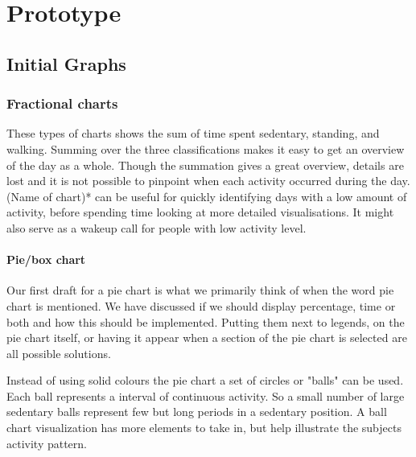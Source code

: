 \chapter{Prototype} %

\label{Chapter5} %


\section{Initial Graphs}

\subsection{Fractional charts}
These types of charts shows the sum of time spent sedentary, standing, and walking. Summing over the three classifications makes it easy to get an overview of the day as a whole. Though the summation gives a great overview, details are lost and it is not possible to pinpoint when each activity occurred during the day. (Name of chart)* can be useful for quickly identifying days with a low amount of activity, before spending time looking at more detailed visualisations. It might also serve as a wakeup call for people with low activity level.

\subsubsection{Pie/box chart}
Our first draft for a pie chart is what we primarily think of when the word pie chart is mentioned. We have discussed if we should display percentage, time or both and how this should be implemented. Putting them next to legends, on the pie chart itself, or having it appear when a section of the pie chart is selected are all possible solutions.

Instead of using solid colours the pie chart a set of circles or "balls" can be used. Each ball represents a interval of continuous activity. So a small number of large sedentary balls represent few but long periods in a sedentary position. A ball chart visualization has more elements to take in, but help illustrate the subjects activity pattern.

